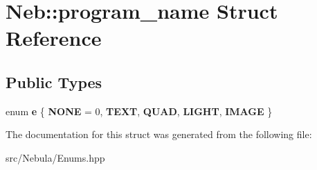 \hypertarget{structNeb_1_1program__name}{\section{\-Neb\-:\-:program\-\_\-name \-Struct \-Reference}
\label{structNeb_1_1program__name}
}
\subsection*{\-Public \-Types}
\begin{DoxyCompactItemize}
\item 
enum {\bfseries e} \{ \*
{\bfseries \-N\-O\-N\-E} =  0, 
{\bfseries \-T\-E\-X\-T}, 
{\bfseries \-Q\-U\-A\-D}, 
{\bfseries \-L\-I\-G\-H\-T}, 
\*
{\bfseries \-I\-M\-A\-G\-E}
 \}
\end{DoxyCompactItemize}


\-The documentation for this struct was generated from the following file\-:\begin{DoxyCompactItemize}
\item 
src/\-Nebula/\-Enums.\-hpp\end{DoxyCompactItemize}
